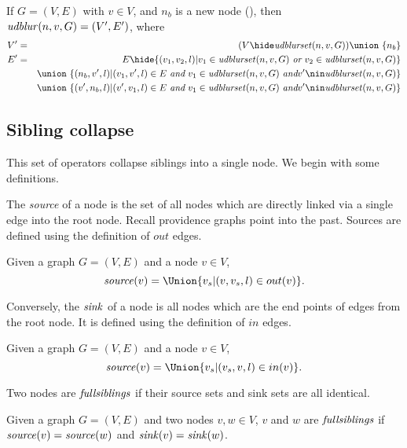 \documentclass{elsarticle}
\begin{document}
\begin{definition} \label{def:undirected-blur}
  If $G = (V,E)$ with $v \in V$, and $n_b$ is a new node (), then $\mathit{udblur}(n,v,G) = (V',E')$, where
  \begin{eqnarray*}
  V' &=& (V\hide \udblurset(n,v,G)) \union\ \{n_b\}\\
  E' &=& E\hide \{(v_1,v_2,l)| v_1 \in \udblurset(n,v,G) ~\emph{or}~ v_2 \in \udblurset(n,v,G)\}\\
  &&\union\ \{(n_b,v',l)|(v_1,v',l) \in E ~\emph{and}~ v_1 \in \udblurset(n,v,G)  ~\emph{and} v' \nin \udblurset(n,v,G) \} \\
  &&\union\ \{(v',n_b,l)|(v',v_1,l) \in E ~\emph{and}~ v_1 \in \udblurset(n,v,G)  ~\emph{and} v' \nin \udblurset(n,v,G) \} \\
  \end{eqnarray*}
\end{definition}



\subsection{Sibling collapse}

This set of operators collapse siblings into a single node. We begin with some definitions.

The \emph{source} of a node is the set of all nodes which are directly linked via a single edge into the root node.  Recall providence graphs point into the past. Sources are defined using the definition of $out$ edges. 

\begin{definition}[$\source$] \label{def:source}
  Given a graph $G = (V,E)$ and a node $v \in V$,
  \[
  \source(v) = \Union\{v_s|(v,v_s,l) \in out(v)\}.
  \]
\end{definition}

Conversely, the $\sink$ of a node is all nodes which are the end points of edges from the root node.  It is defined using the definition of $in$ edges.

\begin{definition}[$\sink$] \label{def:sink}
  Given a graph $G = (V,E)$ and a node $v \in V$,
  \[
  \source(v) = \Union\{v_s|(v_s,v,l) \in in(v)\}.
  \]
\end{definition}

Two nodes are $\fullsiblings$ if their source sets and sink sets are all identical.  

\begin{definition}[$\fullsiblings$] \label{def:fullsiblings}
  Given a graph $G = (V,E)$ and two nodes $v,w \in V$, $v$ and $w$ are $\fullsiblings$ if $\mathit{source}(v) = \mathit{source}(w)$ and $\mathit{sink}(v) = \mathit{sink}(w)$. 
\end{definition}
\end{document}
